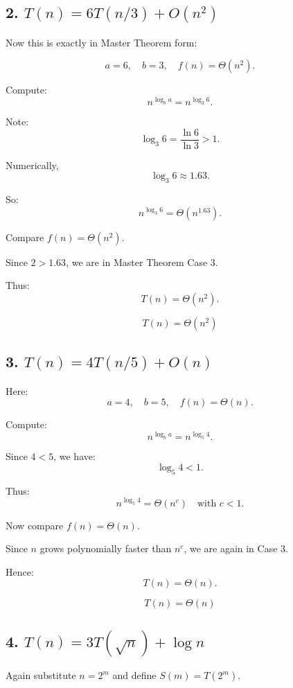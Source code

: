 \documentclass[11pt]{article}
\begin{document}
\newpage

\subsection{2. $T(n)=6T(n/3)+O(n^2)$}

Now this is exactly in Master Theorem form:

\[
a=6,\quad b=3,\quad f(n)=\Theta(n^2).
\]

Compute:
\[
n^{\log_b a} = n^{\log_3 6}.
\]

Note:
\[
\log_3 6 = \frac{\ln 6}{\ln 3} > 1.
\]

Numerically,
\[
\log_3 6 \approx 1.63.
\]

So:
\[
n^{\log_3 6} = \Theta(n^{1.63}).
\]

Compare $f(n)=\Theta(n^2)$.

Since $2 > 1.63$, we are in Master Theorem Case 3.

Thus:
\[
T(n)=\Theta(n^2).
\]

\[
\boxed{T(n)=\Theta(n^2)}
\]

\newpage

\subsection{3. $T(n)=4T(n/5)+O(n)$}

Here:
\[
a=4,\quad b=5,\quad f(n)=\Theta(n).
\]

Compute:
\[
n^{\log_b a}=n^{\log_5 4}.
\]

Since $4<5$, we have:
\[
\log_5 4 < 1.
\]

Thus:
\[
n^{\log_5 4}= \Theta(n^{c}) \quad \text{with } c<1.
\]

Now compare $f(n)=\Theta(n)$.

Since $n$ grows polynomially faster than $n^c$, we are again in Case 3.

Hence:
\[
T(n)=\Theta(n).
\]

\[
\boxed{T(n)=\Theta(n)}
\]

\newpage

\subsection{4. $T(n)=3T(\sqrt{n})+\log n$}

Again substitute $n=2^m$ and define $S(m)=T(2^m)$.
\end{document}
